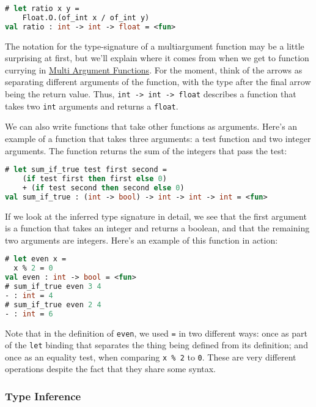 \begin{lstlisting}[language=Caml]
# let ratio x y =
    Float.O.(of_int x / of_int y)
val ratio : int -> int -> float = <fun>
\end{lstlisting}

The notation for the type-signature of a multiargument function may be a
little surprising at first, but we'll explain where it comes from when
we get to function currying in
\href{variables-and-functions.html\#multi-argument-functions}{Multi
Argument Functions}. For the moment, think of the arrows as separating
different arguments of the function, with the type after the final arrow
being the return value. Thus,
\passthrough{\lstinline!int -> int -> float!} describes a function that
takes two \passthrough{\lstinline!int!} arguments and returns a
\passthrough{\lstinline!float!}.

We can also write functions that take other functions as arguments.
Here's an example of a function that takes three arguments: a test
function and two integer arguments. The function returns the sum of the
integers that pass the test:

\begin{lstlisting}[language=Caml]
# let sum_if_true test first second =
    (if test first then first else 0)
    + (if test second then second else 0)
val sum_if_true : (int -> bool) -> int -> int -> int = <fun>
\end{lstlisting}

If we look at the inferred type signature in detail, we see that the
first argument is a function that takes an integer and returns a
boolean, and that the remaining two arguments are integers. Here's an
example of this function in action:

\begin{lstlisting}[language=Caml]
# let even x =
  x % 2 = 0
val even : int -> bool = <fun>
# sum_if_true even 3 4
- : int = 4
# sum_if_true even 2 4
- : int = 6
\end{lstlisting}

Note that in the definition of \passthrough{\lstinline!even!}, we used
\passthrough{\lstinline!=!} in two different ways: once as part of the
\passthrough{\lstinline!let!} binding that separates the thing being
defined from its definition; and once as an equality test, when
comparing \passthrough{\lstinline!x \% 2!} to
\passthrough{\lstinline!0!}. These are very different operations despite
the fact that they share some syntax.

\hypertarget{type-inference}{%
\subsubsection{Type Inference}\label{type-inference}}

